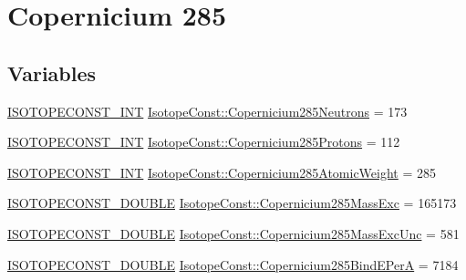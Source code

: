 \hypertarget{group___isotope_const-_copernicium-_cn285}{}\section{Copernicium 285}
\label{group___isotope_const-_copernicium-_cn285}
\subsection*{Variables}
\begin{DoxyCompactItemize}
\item 
\mbox{\hyperlink{group___isotope_const-_macros_ga5f18360b3e99483a35c32d789e62621c}{I\+S\+O\+T\+O\+P\+E\+C\+O\+N\+S\+T\+\_\+\+I\+NT}} \mbox{\hyperlink{group___isotope_const-_copernicium-_cn285_ga68dd279f30384eee42067f401f6214ca}{Isotope\+Const\+::\+Copernicium285\+Neutrons}} = 173
\item 
\mbox{\hyperlink{group___isotope_const-_macros_ga5f18360b3e99483a35c32d789e62621c}{I\+S\+O\+T\+O\+P\+E\+C\+O\+N\+S\+T\+\_\+\+I\+NT}} \mbox{\hyperlink{group___isotope_const-_copernicium-_cn285_ga0994c9ec52e2c382c4272c26f6524f5e}{Isotope\+Const\+::\+Copernicium285\+Protons}} = 112
\item 
\mbox{\hyperlink{group___isotope_const-_macros_ga5f18360b3e99483a35c32d789e62621c}{I\+S\+O\+T\+O\+P\+E\+C\+O\+N\+S\+T\+\_\+\+I\+NT}} \mbox{\hyperlink{group___isotope_const-_copernicium-_cn285_ga2b5b180853cc5e3e2187097e636a2f34}{Isotope\+Const\+::\+Copernicium285\+Atomic\+Weight}} = 285
\item 
\mbox{\hyperlink{group___isotope_const-_macros_ga8f45a7272ce02c0b4c65c44636ed719a}{I\+S\+O\+T\+O\+P\+E\+C\+O\+N\+S\+T\+\_\+\+D\+O\+U\+B\+LE}} \mbox{\hyperlink{group___isotope_const-_copernicium-_cn285_gaca9865d2d5dc963693549bd1607f393f}{Isotope\+Const\+::\+Copernicium285\+Mass\+Exc}} = 165173
\item 
\mbox{\hyperlink{group___isotope_const-_macros_ga8f45a7272ce02c0b4c65c44636ed719a}{I\+S\+O\+T\+O\+P\+E\+C\+O\+N\+S\+T\+\_\+\+D\+O\+U\+B\+LE}} \mbox{\hyperlink{group___isotope_const-_copernicium-_cn285_ga5920cc922726d05f5a8c16dc0ef7f347}{Isotope\+Const\+::\+Copernicium285\+Mass\+Exc\+Unc}} = 581
\item 
\mbox{\hyperlink{group___isotope_const-_macros_ga8f45a7272ce02c0b4c65c44636ed719a}{I\+S\+O\+T\+O\+P\+E\+C\+O\+N\+S\+T\+\_\+\+D\+O\+U\+B\+LE}} \mbox{\hyperlink{group___isotope_const-_copernicium-_cn285_gaf5b41a56e21f9167047886c463b17545}{Isotope\+Const\+::\+Copernicium285\+Bind\+E\+PerA}} = 7184

\end{DoxyCompactItemize}
